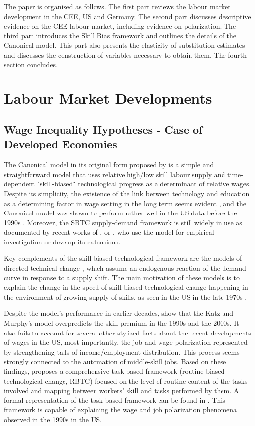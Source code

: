 \documentclass[11pt]{article}
\begin{document}
The paper is organized as follows. The first part reviews the labour market development in the CEE, US and Germany. The second part discusses descriptive evidence on the CEE labour market, including evidence on polarization. The third part introduces the Skill Bias framework and outlines the details of the Canonical model. This part also presents the elasticity of substitution estimates and discusses the construction of variables necessary to obtain them. The fourth section concludes.

\section{Labour Market Developments}
\subsection{Wage Inequality Hypotheses - Case of Developed Economies}

The Canonical model in its original form proposed by \citet{katz1992changes} is a simple and straightforward model that uses relative high/low skill labour supply and time-dependent "skill-biased" technological progress as a determinant of relative wages. Despite its simplicity, the existence of the link between technology and education as a determining factor in wage setting in the long term seems evident \citep{piketty2018capital}, and the Canonical model was shown to perform rather well in the US data before the 1990s \citep{katz1992changes}. Moreover, the SBTC supply-demand framework is still widely in use as documented by recent works of \cite{glitz2021skill}, \cite{aziz2021between} or \cite{farber2021unions}, who use the model for empirical investigation or develop its extensions.

Key complements of the skill-biased technological framework are the models of directed technical change \citep{acemoglu2002directed, acemoglu2002technical}, which assume an endogenous reaction of the demand curve in response to a supply shift. The main motivation of these models is to explain the change in the speed of skill-biased technological change happening in the environment of growing supply of skills, as seen in the US in the late 1970s \citep{acemoglu2002directed}. 

Despite the model's performance in earlier decades, \citet{acemoglu2011skills} show that the Katz and Murphy's model overpredicts the skill premium in the 1990s and the 2000s. It also fails to account for several other stylized facts about the recent developments of wages in the US, most importantly, the job and wage polarization represented by strengthening tails of income/employment distribution. This process seems strongly connected to the automation of middle-skill jobs. Based on these findings, \citet{acemoglu2012does} proposes a comprehensive task-based framework (routine-biased technological change, RBTC) focused on the level of routine content of the tasks involved and mapping between workers' skill and tasks performed by them. A formal representation of the task-based framework can be found in \citet{acemoglu2011skills}. This framework is capable of explaining the wage and job polarization phenomena observed in the 1990s in the US. 
\end{document}
